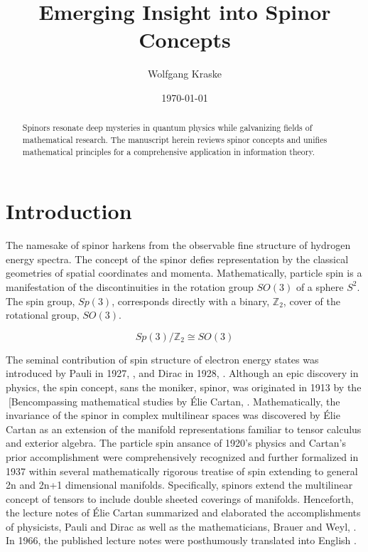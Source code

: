 \documentclass[aps,twocolumn,secnumarabic,nobalancelastpage,amsmath,amssymb,
nofootinbib,parskip=full]{revtex4}
\begin{document}
\title{Emerging Insight into Spinor Concepts}
\author         {Wolfgang Kraske}
\date{\today}

\begin{abstract}
Spinors resonate deep mysteries in quantum physics while
galvanizing fields of mathematical research.
The manuscript herein reviews spinor concepts and
unifies mathematical principles for a comprehensive
application in information theory.
\end{abstract}

\maketitle

\section{Introduction}

The namesake of spinor harkens from the observable fine structure of
hydrogen energy spectra. The concept of the spinor defies representation
by the classical geometries of spatial coordinates and momenta.
Mathematically, particle spin is a manifestation of the discontinuities
in the rotation group $SO(3)$ of a sphere $S^2$. The spin group, $Sp(3)$,
corresponds directly with a binary, $\mathbb{Z}_2$, cover of the
rotational group, $SO(3)$.

\begin{equation}
Sp(3) / \mathbb{Z}_2 \cong SO(3)
\end{equation}

The seminal contribution of spin structure of electron energy states
was introduced by Pauli in 1927, \cite{pauli1927}, and Dirac in 1928,
\cite{dirac1928}. Although an epic discovery in physics,
the spin concept, sans the moniker, spinor, was originated
in 1913 by the [Bencompassing mathematical studies by \'{E}lie Cartan,
\cite{cartan1913}. Mathematically, the invariance of the spinor
in complex multilinear spaces was discovered by \'{E}lie Cartan
as an extension of the manifold
representations familiar to tensor calculus and exterior algebra.
The particle spin ansance of 1920's physics and Cartan's
prior accomplishment were
comprehensively recognized and further formalized in 1937 within several
mathematically rigorous treatise of spin
extending to general 2n and 2n+1 dimensional manifolds. Specifically,
spinors extend the multilinear concept of tensors to include
double sheeted coverings of manifolds.
Henceforth, the lecture notes of \'{E}lie Cartan summarized and
elaborated the accomplishments of physicists, Pauli \cite{pauli1927}
and Dirac \cite{dirac1928} as well as the mathematicians,
Brauer and Weyl, \cite{brauerweyl1937}.
In 1966, the published lecture notes were posthumously
translated into English \cite{cartan1966}.
\end{document}

